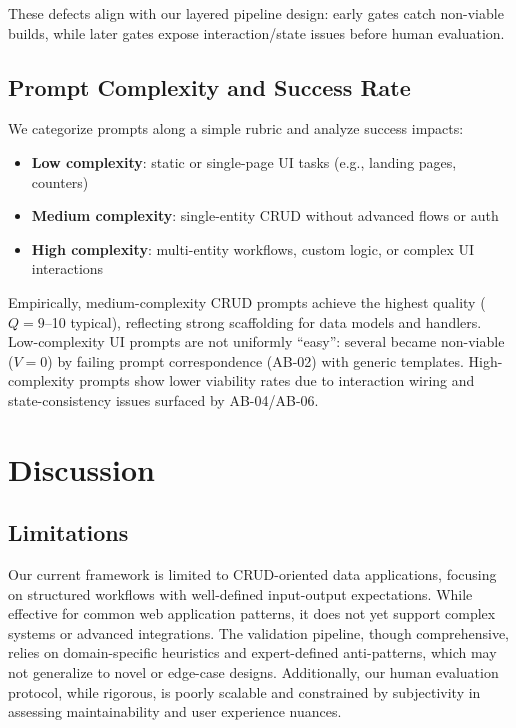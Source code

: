 \documentclass{article}
\begin{document}
These defects align with our layered pipeline design: early gates catch non-viable builds, while later gates expose interaction/state issues before human evaluation.

\subsection{Prompt Complexity and Success Rate}
\label{sec:prompt-complexity}

We categorize prompts along a simple rubric and analyze success impacts:

\begin{itemize}
\item \textbf{Low complexity}: static or single-page UI tasks (e.g., landing pages, counters)
\item \textbf{Medium complexity}: single-entity CRUD without advanced flows or auth
\item \textbf{High complexity}: multi-entity workflows, custom logic, or complex UI interactions
\end{itemize}

Empirically, medium-complexity CRUD prompts achieve the highest quality ($Q=9$--10 typical), reflecting strong scaffolding for data models and handlers. Low-complexity UI prompts are not uniformly ``easy'': several became non-viable ($V=0$) by failing prompt correspondence (AB-02) with generic templates. High-complexity prompts show lower viability rates due to interaction wiring and state-consistency issues surfaced by AB-04/AB-06.

\section{Discussion}
\label{sec:discussion}

\subsection{Limitations}
\label{sec:limitations}

Our current framework is limited to CRUD-oriented data applications, focusing on structured workflows with well-defined input-output expectations. While effective for common web application patterns, it does not yet support complex systems or advanced integrations. The validation pipeline, though comprehensive, relies on domain-specific heuristics and expert-defined anti-patterns, which may not generalize to novel or edge-case designs. Additionally, our human evaluation protocol, while rigorous, is poorly scalable and constrained by subjectivity in assessing maintainability and user experience nuances.
\end{document}
